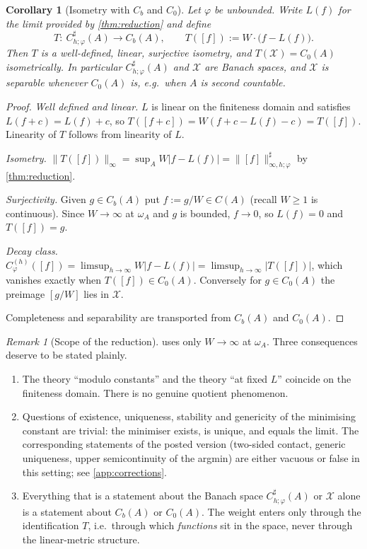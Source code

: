 \documentclass[11pt,a4paper]{article}
\numberwithin{equation}{section}
\theoremstyle{plain}
\newtheorem{corollary}[theorem]{Corollary}
\theoremstyle{definition}
\theoremstyle{remark}
\newtheorem{remark}[theorem]{Remark}
\newcommand{\wA}{\omega_A}
\newcommand{\Cb}{C_b}
\newcommand{\Cz}{C_0}
\newcommand{\Xdec}{\mathcal{X}}
\begin{document}
\begin{corollary}[Isometry with $\Cb$ and $\Cz$]\label{cor:isometry}
Let $\varphi$ be unbounded. Write $L(f)$ for the limit provided by
\cref{thm:reduction} and define
\[
T:\ C^{\sharp}_{h;\varphi}(A)\longrightarrow \Cb(A),\qquad
T([f]):=W\cdot\bigl(f-L(f)\bigr).
\]
Then $T$ is a well-defined, linear, surjective isometry, and
$T(\Xdec)=\Cz(A)$ isometrically. In particular $C^{\sharp}_{h;\varphi}(A)$ and $\Xdec$
are Banach spaces, and $\Xdec$ is separable whenever $\Cz(A)$ is, e.g.\ when $A$ is
second countable.
\end{corollary}

\begin{proof}
\emph{Well defined and linear.} $L$ is linear on the finiteness domain and satisfies
$L(f+c)=L(f)+c$, so $T([f+c])=W(f+c-L(f)-c)=T([f])$. Linearity of $T$ follows from
linearity of $L$.

\emph{Isometry.} $\|T([f])\|_\infty=\sup_AW|f-L(f)|=\|[f]\|^{\sharp}_{\infty,h;\varphi}$
by \cref{thm:reduction}.

\emph{Surjectivity.} Given $g\in \Cb(A)$ put $f:=g/W\in C(A)$ (recall $W\ge1$ is
continuous). Since $W\to\infty$ at $\wA$ and $g$ is bounded, $f\to0$, so $L(f)=0$ and
$T([f])=g$.

\emph{Decay class.} $C^{(h)}_\varphi([f])=\limsup_{h\to\infty}W|f-L(f)|
=\limsup_{h\to\infty}|T([f])|$, which vanishes exactly when $T([f])\in\Cz(A)$. Conversely
for $g\in\Cz(A)$ the preimage $[g/W]$ lies in $\Xdec$.

Completeness and separability are transported from $\Cb(A)$ and $\Cz(A)$.
\end{proof}

\begin{remark}[Scope of the reduction]\label{rem:scope}
 uses only $W\to\infty$ at $\wA$. Three consequences deserve to be
stated plainly.
\begin{enumerate}
\item The theory ``modulo constants'' and the theory ``at fixed $L$'' coincide on the
finiteness domain. There is no genuine quotient phenomenon.
\item Questions of existence, uniqueness, stability and genericity of the minimising
constant are trivial: the minimiser exists, is unique, and equals the limit. The
corresponding statements of the posted version (two-sided contact, generic uniqueness,
upper semicontinuity of the argmin) are either vacuous or false in this setting; see
\cref{app:corrections}.
\item Everything that is a statement about the Banach space
$C^{\sharp}_{h;\varphi}(A)$ or $\Xdec$ alone is a statement about $\Cb(A)$ or $\Cz(A)$.
The weight enters only through the identification $T$, i.e.\ through which \emph{functions}
sit in the space, never through the linear-metric structure.
\end{enumerate}
\end{remark}
\end{document}
